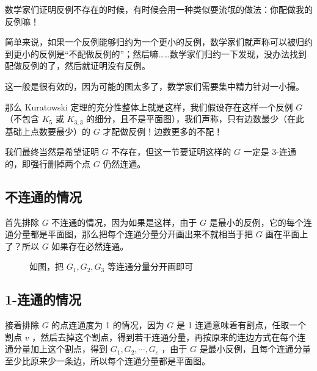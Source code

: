 \documentclass[11pt, a4paper]{ctexart}
\begin{document}
数学家们证明反例不存在的时候，有时候会用一种类似耍流氓的做法：你配做我的反例嘛！

简单来说，如果一个反例能够归约为一个更小的反例，数学家们就声称可以被归约到更小的反例是“不配做反例的”；然后嘛……数学家们归约一下发现，没办法找到配做反例的了，然后就证明没有反例。

这一般是很有效的，因为可能的图太多了，数学家们需要集中精力针对一小撮。

那么 Kuratowski 定理的充分性整体上就是这样，我们假设存在这样一个反例 $G$ （不包含 $K_5$ 或 $K_{3,3}$ 的细分，且不是平面图），我们声称，只有边数最少（在此基础上点数要最少）的 $G$ 才配做反例！边数更多的不配！

我们最终当然是希望证明 $G$ 不存在，但这一节要证明这样的 $G$ 一定是 3-连通的，即强行删掉两个点 $G$ 仍然连通。

\subsection{不连通的情况}
首先排除 $G$ 不连通的情况，因为如果是这样，由于 $G$ 是最小的反例，它的每个连通分量都是平面图，那么把每个连通分量分开画出来不就相当于把 $G$ 画在平面上了？所以 $G$ 如果存在必然连通。

\begin{figure}[H]
    \centering
    \caption{如图，把 $G_1, G_2, G_3$ 等连通分量分开画即可}
\end{figure}

\subsection{1-连通的情况}
接着排除 $G$ 的点连通度为 1 的情况，因为 $G$ 是 1 连通意味着有割点，任取一个割点 $v$ ，然后去掉这个割点，得到若干连通分量，再按原来的连边方式在每个连通分量加上这个割点，得到 $G_1,G_2,\cdots,G_c$ ，由于 $G$ 是最小反例，且每个连通分量至少比原来少一条边，所以每个连通分量都是平面图。
\end{document}

